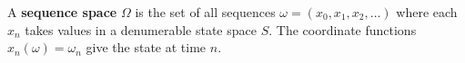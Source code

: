 A \textbf{sequence space} $\Omega$ is the set of all sequences $\omega = (x_0, x_1, x_2, \ldots)$ where each $x_n$ takes values in a denumerable state space $S$. The coordinate functions $x_n(\omega) = \omega_n$ give the state at time $n$.